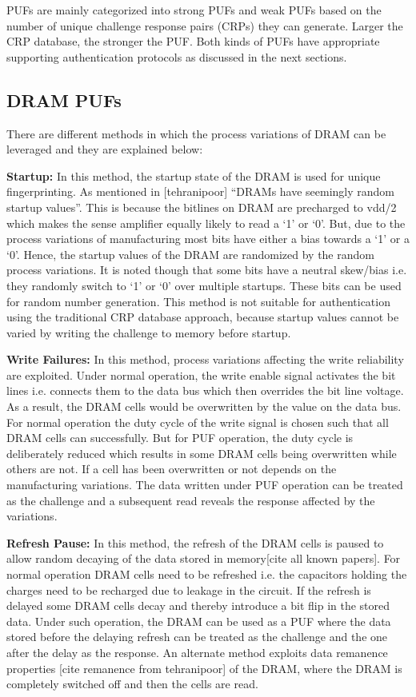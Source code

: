 \documentclass[journal, a4paper]{IEEEtran}
\begin{document}
PUFs are mainly categorized into strong PUFs and weak PUFs based on the number of unique challenge response pairs (CRPs) they can generate. Larger the CRP database, the stronger the PUF. Both kinds of PUFs have appropriate supporting authentication protocols as discussed in the next sections.

\subsection{DRAM PUFs}
There are different methods in which the process variations of DRAM can be leveraged and they are explained below:

\textbf{Startup:} In this method, the startup state of the DRAM is used for unique fingerprinting. As mentioned in [tehranipoor] “DRAMs have seemingly random startup values”. This is because the bitlines on DRAM are precharged to vdd/2 which makes the sense amplifier equally likely to read a ‘1’ or ‘0’. But, due to the process variations of manufacturing most bits have either a bias towards a ‘1’ or a ‘0’. Hence, the startup values of the DRAM are randomized by the random process variations. It is noted though that some bits have a neutral skew/bias i.e. they randomly switch to ‘1’ or ‘0’ over multiple startups. These bits can be used for random number generation. This method is not suitable for authentication using the traditional CRP database approach, because startup values cannot be varied by writing the challenge to memory before startup.

\textbf{Write Failures:} In this method, process variations affecting the write reliability are exploited. Under normal operation, the write enable signal activates the bit lines i.e. connects them to the data bus which then overrides the bit line voltage. As a result, the DRAM cells would be overwritten by the value on the data bus. For normal operation the duty cycle of the write signal is chosen such that all DRAM cells can successfully. But for PUF operation, the duty cycle is deliberately reduced which results in some DRAM cells being overwritten while others are not. If a cell has been overwritten or not depends on the manufacturing variations. The data written under PUF operation can be treated as the challenge and a subsequent read reveals the response affected by the variations.

\textbf{Refresh Pause:} In this method, the refresh of the DRAM cells is paused to allow random decaying of the data stored in memory[cite all known papers]. For normal operation DRAM cells need to be refreshed i.e. the capacitors holding the charges need to be recharged due to leakage in the circuit. If the refresh is delayed some DRAM cells decay and thereby introduce a bit flip in the stored data. Under such operation, the DRAM can be used as a PUF where the data stored before the delaying refresh can be treated as the challenge and the one after the delay as the response. An alternate method exploits data remanence properties [cite remanence from tehranipoor] of the DRAM, where the DRAM is completely switched off and then the cells are read.
\end{document}

